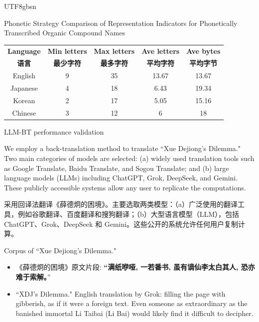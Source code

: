 \documentclass{beamer}
\begin{document}
\begin{CJK*}{UTF8}{gbsn}
\begin{frame}{Phonetic Strategy}
Comparison of Representation Indicators for Phonetically Transcribed Organic Compound Names
\begin{table}%
\centering
\label{tab:comparison}
\begin{tabular}{ccccc}
\hline
\textbf{Language} & \textbf{Min letters} & \textbf{Max letters} & \textbf{Ave letters} & \textbf{Ave bytes}  \\
\textbf{语言} & \textbf{最少字符} & \textbf{最多字符} & \textbf{平均字符} & \textbf{平均字节}  \\
\hline
English & 9 & 35 & 13.67 & 13.67 \\

Japanese & 4 & 18 & 6.43 & 19.34  \\

Korean & 2 & 17 & 5.05 & 15.16  \\

Chinese & 3 & 12 & 6 & 18  \\
\hline
\end{tabular}
\end{table}
\end{frame}

\begin{frame}{LLM-BT performance validation}

We employ a back-translation method to translate “Xue Dejiong’s Dilemma." Two main categories of models are selected: (a) widely used translation tools such as Google Translate, Baidu Translate, and Sogou Translate; and (b) large language models (LLMs) including ChatGPT, Grok, DeepSeek, and Gemini. These publicly accessible systems allow any user to replicate the computations.

采用回译法翻译《薛德炯的困境》。主要选取两类模型：（a）广泛使用的翻译工具，例如谷歌翻译、百度翻译和搜狗翻译；（b）大型语言模型（LLM），包括 ChatGPT、Grok、DeepSeek 和 Gemini。这些公开的系统允许任何用户复制计算。

\end{frame}

\begin{frame}{Corpus of “Xue Dejiong’s Dilemma."}
\begin{itemize}
    
\item 《薛德炯的困境》原文片段: \textbf{  ``满纸咿哑, 一若番书, 虽有谪仙李太白其人, 恐亦难于索解。}'' 

\item “XDJ’s Dilemma." English translation by Grok: filling the page with gibberish, as if it were a foreign text. Even someone as extraordinary as the banished immortal Li Taibai (Li Bai) would likely find it difficult to decipher.


\end{itemize}
\end{frame}
\end{CJK*}
\end{document}
